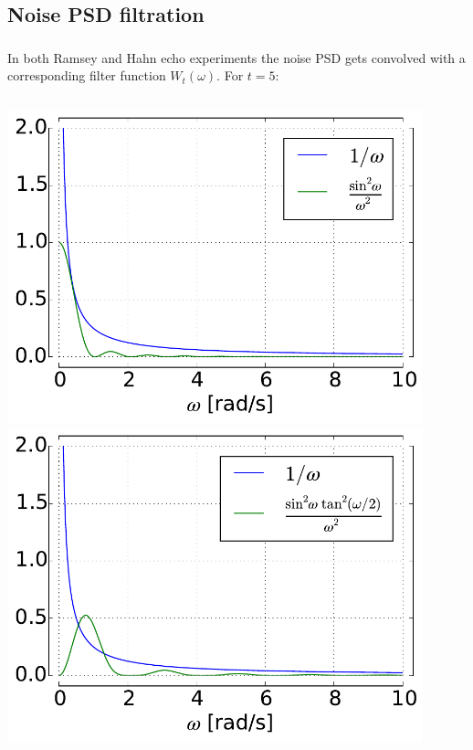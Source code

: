 \documentclass[aspectratio=169, 13pt]{beamer}
\begin{document}
\subsection{Noise PSD filtration}
\begin{frame}[c]\frametitle{\secname}\framesubtitle{\subsecname}
In both Ramsey and Hahn echo experiments the noise PSD gets convolved with a corresponding filter function $W_t(\omega)$. For $t=5$:

\vspace{0.5cm}
\begin{columns}[c]
\centering\includegraphics[width=0.9\textwidth]{ramsey_filter}
\centering\includegraphics[width=0.9\textwidth]{hahn_filter}
\end{columns}

\end{frame}
\end{document}
